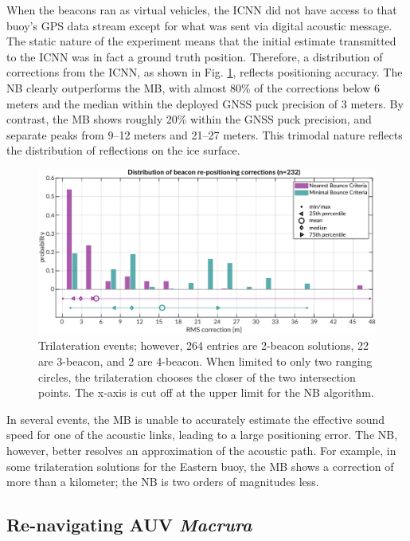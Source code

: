 When the beacons ran as virtual vehicles, the ICNN did not have access to that buoy's GPS data stream except for what was sent via digital acoustic message.
The static nature of the experiment means that the initial estimate transmitted to the ICNN was in fact a ground truth position.
Therefore, a distribution of corrections from the ICNN, as shown in Fig. \ref{fig:trilat-beacon}, reflects positioning accuracy.
The NB clearly outperforms the MB, with almost 80\% of the corrections below 6 meters and the median within the deployed GNSS puck precision of 3 meters.
By contrast, the MB shows roughly 20\% within the GNSS puck precision, and separate peaks from 9--12 meters and 21--27 meters.
This trimodal nature reflects the distribution of reflections on the ice surface.

\begin{figure}[!ht]
\includegraphics[width=\textwidth]{figs/beacon-trilat-stat.pdf}
\caption{Trilateration events; however, 264 entries are 2-beacon solutions, 22 are 3-beacon, and 2 are 4-beacon. When limited to only two ranging circles, the trilateration chooses the closer of the two intersection points. The x-axis is cut off at the upper limit for the NB algorithm.}
\label{fig:trilat-beacon}
\end{figure}

In several events, the MB is unable to accurately estimate the effective sound speed for one of the acoustic links, leading to a large positioning error.
The NB, however, better resolves an approximation of the acoustic path.
For example, in some trilateration solutions for the Eastern buoy, the MB shows a correction of more than a kilometer; the NB is two orders of magnitudes less.

\subsection{Re-navigating AUV \emph{Macrura}}


